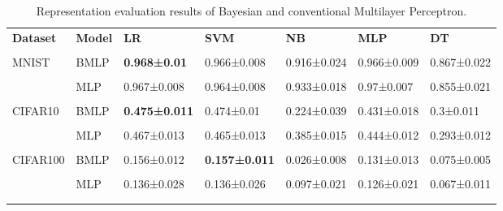 \begin{table}[h]
    \centering
    \footnotesize
    \begin{tabular}{lllllll}\n\toprule\n \textbf{Dataset} &  \textbf{Model} &          \textbf{LR} &         \textbf{SVM} &          \textbf{NB} &         \textbf{MLP} &          \textbf{DT} \\\\\n\midrule\n    MNIST & BMLP &  \textbf{0.968±0.01} & 0.966±0.008 & 0.916±0.024 & 0.966±0.009 & 0.867±0.022 \\\\\n   & MLP & 0.967±0.008 & 0.964±0.008 & 0.933±0.018 &  0.97±0.007 & 0.855±0.021 \\\\\n CIFAR10 & BMLP & \textbf{0.475±0.011} &  0.474±0.01 & 0.224±0.039 & 0.431±0.018 &   0.3±0.011 \\\\\n & MLP & 0.467±0.013 & 0.465±0.013 & 0.385±0.015 & 0.444±0.012 & 0.293±0.012 \\\\\n CIFAR100 & BMLP & 0.156±0.012 & \textbf{0.157±0.011} & 0.026±0.008 & 0.131±0.013 & 0.075±0.005 \\\\\n  & MLP & 0.136±0.028 & 0.136±0.026 & 0.097±0.021 & 0.126±0.021 & 0.067±0.011 \\\\\n\bottomrule\n 
    \end{tabular}
    \caption[Representations evaluation for BMLP and MLP]{Representation evaluation results of Bayesian and conventional Multilayer Perceptron.}
    \label{tab:bnn_mlp}
\end{table}